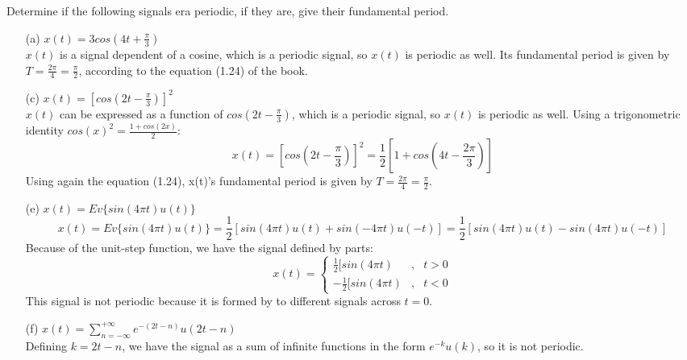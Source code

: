 \documentclass{article}
\begin{document}
\subsection{} Determine if the following signals era periodic, if they are, give their fundamental period.
\begin{enumerate}
\item[(a)] $x(t) = 3cos(4t+\frac{\pi}{3})$ \\
$x(t)$ is a signal dependent of a cosine, which is a periodic signal, so $x(t)$ is periodic as well. Its fundamental period is given by $T = \frac{2\pi}{4} = \frac{\pi}{2}$, according to the equation (1.24) of the book.
\item[(c)] $x(t) = [cos(2t-\frac{\pi}{3})]^{2}$ \\
$x(t)$ can be expressed as a function of $cos(2t-\frac{\pi}{3})$, which is a periodic signal, so $x(t)$ is periodic as well. Using a trigonometric identity $cos(x)^{2} = \frac{1+cos(2x)}{2}$:
\begin{equation*}
x(t) = [cos(2t-\frac{\pi}{3})]^{2} = \frac{1}{2}[1+cos(4t-\frac{2\pi}{3})]
\end{equation*}
Using again the equation (1.24), x(t)'s fundamental period is given by $T = \frac{2\pi}{4} = \frac{\pi}{2}$.
\item[(e)] $x(t) = Ev\{sin(4\pi t)u(t)\}$ \\
\begin{equation*}
x(t) = Ev\{sin(4\pi t)u(t)\} = \frac{1}{2}[sin(4\pi t)u(t)+sin(-4\pi t)u(-t)] = \frac{1}{2}[sin(4\pi t)u(t)-sin(4\pi t)u(-t)]
\end{equation*}
Because of the unit-step function, we have the signal defined by parts:
\begin{equation*}
x(t) = \left\{ \begin{array}{lll} \frac{1}{2}[sin(4\pi t)&,& t > 0 \\ -\frac{1}{2}[sin(4\pi t)&,& t < 0\end{array} \right.
\end{equation*}
This signal is not periodic because it is formed by to different signals across $t=0$.
\item[(f)] $x(t) = \sum\limits_{n=-\infty}^{+\infty} e^{-(2t-n)}u(2t-n)$ \\
Defining $k = 2t-n$, we have the signal as a sum of infinite functions in the form $e^{-k}u(k)$, so it is not periodic.
\end{enumerate}
\end{document}
